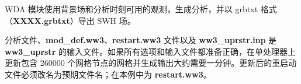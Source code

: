 WDA 模块使用背景场和分析时刻可用的观测，生成分析，并以 grbtxt 格式（\textbf{XXXX.grbtxt}）导出 SWH 场。

分析文件、\textbf{mod\_def.ww3}、\textbf{restart.ww3} 文件以及 \textbf{ww3\_uprstr.inp} 是 \textbf{ww3\_uprstr} 的输入文件。如果所有选项和输入文件都准备正确，在单处理器上更新包含 260000 个网格节点的网格并生成输出大约需要一分钟。更新后的重启动文件必须改名为预期文件名；在本例中为 \textbf{restart.ww3}。\newline

   \noindent{}


\pb
